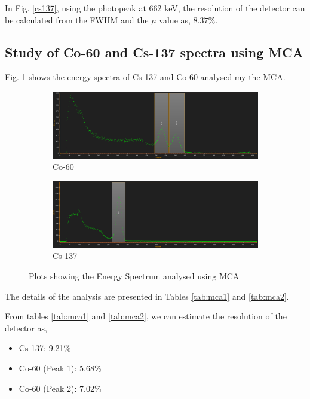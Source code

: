In Fig. \ref{cs137}, using the photopeak at 662 keV, the resolution of the detector can be calculated from the FWHM and the $\mu$ value as, $\boxed{8.37\%}$.

\subsection{Study of Co-60 and Cs-137 spectra using MCA}

Fig. \ref{espec} shows the energy spectra of Cs-137 and Co-60 analysed my the MCA.

\begin{figure}[H]
    \begin{subfigure}{\linewidth}
    \includegraphics[width=1\textwidth]{images/co60.png}
    \caption{Co-60}
    \end{subfigure}
    
    \begin{subfigure}{\linewidth}
    \includegraphics[width=1\textwidth]{images/cs137.png}
    \caption{Cs-137}
    \end{subfigure}
    \caption{Plots showing the Energy Spectrum analysed using MCA}
    \label{espec}
\end{figure}

The details of the analysis are presented in Tables \ref{tab:mca1} and \ref{tab:mca2}.



From tables \ref{tab:mca1} and \ref{tab:mca2}, we can estimate the resolution of the detector as,

\begin{itemize}
    \item Cs-137: 9.21\%
    \item Co-60 (Peak 1): 5.68\%
    \item Co-60 (Peak 2): 7.02\%
\end{itemize}


